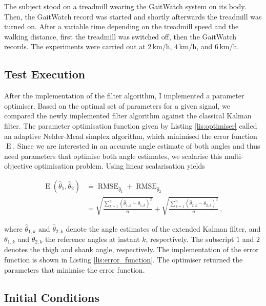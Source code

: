 The subject stood on a treadmill wearing the GaitWatch system on its body. Then, the GaitWatch record was started and shortly afterwards the treadmill was turned on. After a variable time depending on the treadmill speed and the walking distance, first the treadmill was switched off, then the GaitWatch records. The experiments were carried out at $2$\,km/h, $4$\,km/h, and $6$\,km/h.

\subsection{Test Execution}

After the implementation of the filter algorithm, I implemented a parameter optimiser. Based on the optimal set of parameters for a given signal, we compared the newly implemented filter algorithm against the classical Kalman filter. The parameter optimisation function given by Listing \ref{lis:optimiser} called an adaptive Nelder-Mead simplex algorithm, which minimised the error function $\operatorname{E}$. Since we are interested in an accurate angle estimate of both angles and thus need parameters that optimise both angle estimates, we scalarise this multi-objective optimisation problem. Using linear scalarisation yields

\begin{equation}
\begin{split}
  \operatorname{E}(\hat{\theta}_1, \hat{\theta}_2) &= \operatorname{RMSE}_{\hat{\theta}_1} + \operatorname{RMSE}_{\hat{\theta}_2} \\
  &= \sqrt{\frac{\sum_{k=1}^n (\hat{\theta}_{1, k} - \theta_{1, k})^2}{n}} + \sqrt{\frac{\sum_{k=1}^n (\hat{\theta}_{2, k} - \theta_{2, k})^2}{n}}\,,
\end{split}
\end{equation}

\noindent
where $\hat{\theta}_{1,k}$ and $\hat{\theta}_{2,k}$ denote the angle estimates of the extended Kalman filter, and $\theta_{1, k}$ and $\theta_{2, k}$ the reference angles at instant $k$, respectively. The subscript $1$ and $2$ denotes the thigh and shank angle, respectively. The implementation of the error function is shown in Listing \ref{lis:error_function}. The optimiser returned the parameters that minimise the error function.

\subsection{Initial Conditions}

